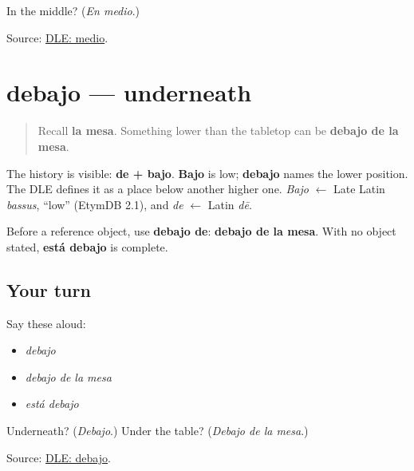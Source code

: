 \begin{tcolorbox}[breakable,colback=teal!4,colframe=teal!35!black,title={Before you move on}]
In the middle? (\emph{En medio}.)

Source: \href{https://dle.rae.es/medio}{DLE: medio}.
\end{tcolorbox}
\section[debajo]{debajo — underneath}

\label{lesson:ES-C407-debajo}



\begin{quote}
Recall \textbf{la mesa}. Something lower than the tabletop can be \textbf{debajo de la mesa}.
\end{quote}

\begin{cousinweb}
The history is visible: \textbf{de + bajo}. \textbf{Bajo} is low; \textbf{debajo} names the lower position. The DLE defines it as a place below another higher one. \emph{Bajo} $\leftarrow$ Late Latin \emph{bassus}, \textquotedblleft{}low\textquotedblright{} (EtymDB 2.1), and \emph{de} $\leftarrow$ Latin \emph{dē}.
\end{cousinweb}

\begin{grammarlens}[title={Grammar Lens: debajo de}]
Before a reference object, use \textbf{debajo de}: \textbf{debajo de la mesa}. With no object stated, \textbf{está debajo} is complete.
\end{grammarlens}

\subsection*{Your turn}
Say these aloud:

\begin{itemize}
\raggedright
  \item \emph{debajo}
  \item \emph{debajo de la mesa}
  \item \emph{está debajo}
\end{itemize}

\begin{tcolorbox}[breakable,colback=teal!4,colframe=teal!35!black,title={Before you move on}]
Underneath? (\emph{Debajo}.) Under the table? (\emph{Debajo de la mesa}.)

Source: \href{https://dle.rae.es/debajo}{DLE: debajo}.
\end{tcolorbox}
